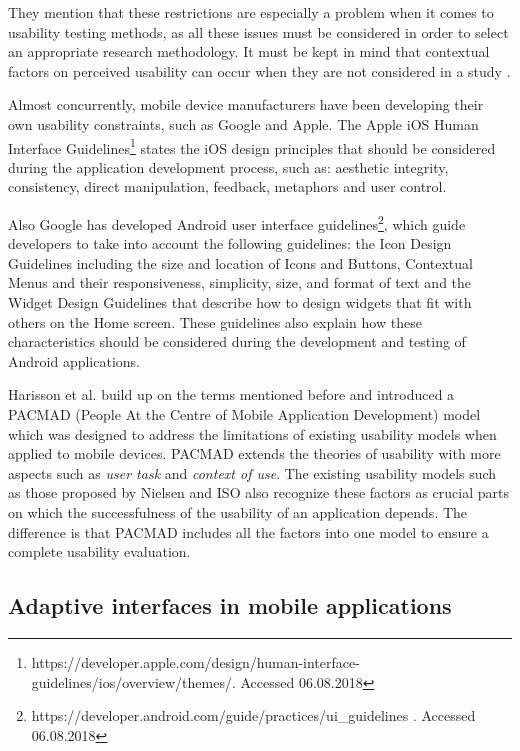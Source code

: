 They mention that these restrictions are especially a problem when it comes to usability testing methods, as all these issues must be considered in order to select an appropriate research methodology. It must be kept in mind that contextual factors on perceived usability can occur when they are not considered in a study \cite{zhang2005challenges}.

Almost concurrently, mobile device manufacturers have been developing their own usability constraints, such as Google and Apple. The Apple iOS Human Interface Guidelines\footnote{https://developer.apple.com/design/human-interface-guidelines/ios/overview/themes/. Accessed 06.08.2018} states the iOS design principles that should be considered during the application development process, such as: aesthetic integrity, consistency, direct manipulation, feedback, metaphors and user control. 

Also Google has developed Android user interface guidelines\footnote{https://developer.android.com/guide/practices/ui\_guidelines . Accessed 06.08.2018}, which guide developers to take into account the following guidelines: the Icon Design Guidelines including the size and location of Icons and Buttons, Contextual Menus and their responsiveness, simplicity, size, and format of text and the Widget Design Guidelines that describe how to design widgets that fit with others on the Home screen. These guidelines also explain how these characteristics should be considered during the development and testing of Android applications. 

Harisson et al. \cite{harrison2013usability} build up on the terms mentioned before and introduced a PACMAD (People At the Centre of Mobile Application Development) model which was designed to address the limitations of existing usability models when applied to mobile devices. PACMAD extends the theories of usability with more aspects such as \textit{user task} and \textit{context of use}. The existing usability models such as those proposed by Nielsen \cite{nielsen1994usability} and ISO \cite{bevan1998iso} also recognize these factors as crucial parts on which the successfulness of the usability of an application depends. The difference is that PACMAD includes all the factors into one model to ensure a complete usability evaluation.

\subsection{Adaptive interfaces in mobile applications}

